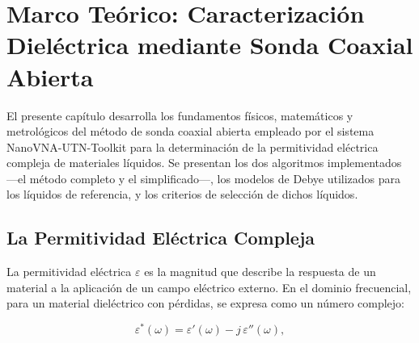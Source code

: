 %
%
%    
%    
%    

\section{Marco Teórico: Caracterización Dieléctrica mediante Sonda Coaxial Abierta}

El presente capítulo desarrolla los fundamentos físicos, matemáticos y metrológicos
del método de sonda coaxial abierta empleado por el sistema NanoVNA-UTN-Toolkit
para la determinación de la permitividad eléctrica compleja de materiales líquidos.
Se presentan los dos algoritmos implementados —el método completo y el simplificado—,
los modelos de Debye utilizados para los líquidos de referencia, y los criterios de
selección de dichos líquidos.

\newpage
\Encabezado

\subsection{La Permitividad Eléctrica Compleja}

La permitividad eléctrica $\varepsilon$ es la magnitud que describe la respuesta de
un material a la aplicación de un campo eléctrico externo. En el dominio frecuencial,
para un material dieléctrico con pérdidas, se expresa como un número complejo:

\begin{equation}
    \varepsilon^*(\omega) = \varepsilon'(\omega) - j\,\varepsilon''(\omega),
    \label{eq:permitividad_compleja}
\end{equation}


